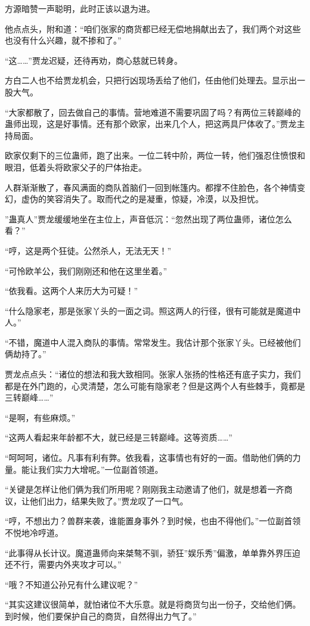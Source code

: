 \begin{this_body}
方源暗赞一声聪明，此时正该以退为进。

他点点头，附和道：“咱们张家的商货都已经无偿地捐献出去了，我们两个对这些也没有什么兴趣，就不掺和了。”

“这……”贾龙迟疑，还待再劝，商心慈就已转身。

方白二人也不给贾龙机会，只把行凶现场丢给了他们，任由他们处理去。显示出一股大气。

“大家都散了，回去做自己的事情。营地难道不需要巩固了吗？有两位三转巅峰的蛊师出现，这是好事情。还有那个欧家，出来几个人，把这两具尸体收了。”贾龙主持局面。

欧家仅剩下的三位蛊师，跑了出来。一位二转中阶，两位一转，他们强忍住愤恨和眼泪，低着头将欧家父子的尸体抬走。

人群渐渐散了，春风满面的商队首脑们一回到帐篷内。都撑不住脸色，各个神情变幻，虚伪的笑容消失了。取而代之的是凝重，惊疑，冷漠，以及担忧。

”蛊真人”贾龙缓缓地坐在主位上，声音低沉：“忽然出现了两位蛊师，诸位怎么看？”

“哼，这是两个狂徒。公然杀人，无法无天！”

“可怜欧羊公，我们刚刚还和他在这里坐着。”

“依我看。这两个人来历大为可疑！”

“什么隐家老，那是张家丫头的一面之词。照这两人的行径，很有可能就是魔道中人。”

“不错，魔道中人混入商队的事情。常常发生。我估计那个张家丫头。已经被他们俩劫持了。”

贾龙点点头：“诸位的想法和我大致相同。张家人张扬的性格还有底子实力，我们都是在外门跑的，心灵清楚，怎么可能有隐家老？但是这两个人有些棘手，竟都是三转巅峰……”

“是啊，有些麻烦。”

“这两人看起来年龄都不大，就已经是三转巅峰。这等资质……”

“呵呵呵，诸位。凡事有利有弊。依我看，这事情也有好的一面。借助他们俩的力量。能让我们实力大增呢。”一位副首领道。

“关键是怎样让他们俩为我们所用呢？刚刚我主动邀请了他们，就是想着一齐商议，让他们出力，结果失败了。”贾龙叹了一口气。

“哼，不想出力？兽群来袭，谁能置身事外？到时候，也由不得他们。”一位副首领不悦地冷哼道。

“此事得从长计议。魔道蛊师向来桀骜不驯，骄狂”娱乐秀”偏激，单单靠外界压迫还不行，需要内外夹攻才可以。”

“哦？不知道公孙兄有什么建议呢？”

“其实这建议很简单，就怕诸位不大乐意。就是将商货匀出一份子，交给他们俩。到时候，他们要保护自己的商货，自然得出力气了。”


\end{this_body}
